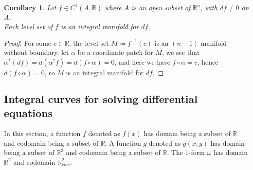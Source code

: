 \documentclass[11pt,oneside]{book}
\theoremstyle{break}
\theoremstyle{break}
\newtheorem{corL}{Corollary}[lem]
\newcommand{\R}{\mathbb{R}}
\begin{document}
\begin{corL}
Let $f \in C^1(A,\R)$ where $A$ is an open subset of $\R^n$, with $df \neq 0$ on $A$.\\
Each level set of $f$ is an integral manifold for $df$.
\end{corL}
\begin{proof}
For some $c \in \R$, the level set $M \coloneqq f^{-1}(c)$ is an $(n-1)$-manifold without boundary. let $\alpha$ be a coordinate patch for $M$, we see that $\alpha^*(df) = d(\alpha^* f) = d(f\circ \alpha) = 0$, and here we have $f\circ \alpha = c$, hence $d(f\circ \alpha) = 0$, so $M$ is an integral manifold for $df$. 
\end{proof}

\subsection*{Integral curves for solving differential equations}
In this section, a function $f$ denoted as $f(x)$ has domain being a subset of $\R$ and codomain being a subset of $\R$; A function $g$ denoted as $g(x,y)$ has domain being a subset of $\R^2$ and codomain being a subset of $\R$. The $1$-form $\omega$ has domain $\R^2$ and codomain $\R^2_{row}$.\\
\end{document}
